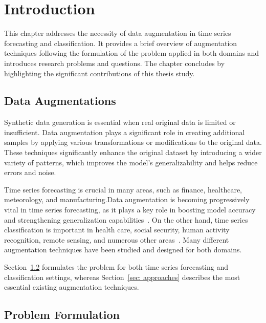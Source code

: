 
\chapter{Introduction}


This chapter addresses the necessity of data augmentation in time series forecasting and classification. It provides a brief overview of augmentation techniques following the formulation of the problem applied in both domains and introduces research problems and questions. The chapter concludes by highlighting the significant contributions of this thesis study.


\section{Data Augmentations}

Synthetic data generation is essential when real original data is limited or insufficient. Data augmentation plays a significant role in creating additional samples by applying various transformations or modifications to the original data. These techniques significantly enhance the original dataset by introducing a wider variety of patterns, which improves the model's generalizability and helps reduce errors and noise.

Time series forecasting is crucial in many areas, such as finance, healthcare, meteorology, and manufacturing.Data augmentation is becoming progressively vital in time series forecasting, as it plays a key role in boosting model accuracy and strengthening generalization capabilities~\cite{chen2023fraugfrequencydomainaugmentation, arabi2024wavemaskmixexploringwaveletbasedaugmentations}. On the other hand, time series classification is important in health care, social security, human activity recognition, remote sensing, and numerous other areas~\cite{Ismail_Fawaz_2020}. Many different augmentation techniques have been studied and designed for both domains. 

Section~\ref{section:formulation} formulates the problem for both time series forecasting and classification settings, whereas Section~\ref{sec: approaches} describes the most essential existing augmentation techniques.






\section{Problem Formulation} \label{section:formulation}

